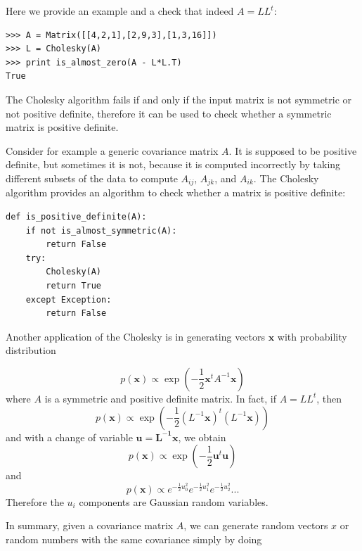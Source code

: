 \documentclass[justified,sixbynine]{tufte-book}
\def\ft{\small\tt}
\theoremstyle{plain}%
\theoremstyle{definition}
\theoremstyle{remark}
\begin{document}
\begin{fullwidth}
Here we provide an example and a check that indeed $A=L L^t$:

\begin{lstlisting}[caption={in file: {\ft nlib.py}}]
>>> A = Matrix([[4,2,1],[2,9,3],[1,3,16]])
>>> L = Cholesky(A)
>>> print is_almost_zero(A - L*L.T)
True
\end{lstlisting}

The Cholesky algorithm fails if and only if the input matrix is not symmetric or not positive definite, therefore it can be used to check whether a symmetric matrix is positive definite.

Consider for example a generic covariance matrix $A$. It is supposed to be positive definite, but sometimes it is not, because it is computed incorrectly by taking different subsets of the data to compute $A_{ij}$, $A_{jk}$, and $A_{ik}$. The Cholesky algorithm provides an algorithm to check whether a matrix is positive definite:

\begin{lstlisting}[caption={in file: {\ft nlib.py}}]
def is_positive_definite(A):
    if not is_almost_symmetric(A):
        return False
    try:
        Cholesky(A)
        return True
    except Exception:
        return False
\end{lstlisting}

Another application of the Cholesky is in generating vectors $\mathbf{x}$ with probability distribution

\begin{equation}
p(\mathbf{x}) \propto \exp\left(-\frac12 \mathbf{x}^t A^{-1} \mathbf{x}\right)
\end{equation}
where $A$ is a symmetric and positive definite matrix. In fact, if $A=LL^t$, then
\begin{equation}
p(\mathbf{x}) \propto \exp\left(-\frac12 (L^{-1}\mathbf{x})^t (L^{-1}\mathbf{x})\right)
\end{equation}
and with a change of variable $\mathbf{u}=\mathbf{L^{-1}x}$, we obtain
\begin{equation}
p(\mathbf{x}) \propto \exp\left(-\frac12 \mathbf{u}^t \mathbf{u}\right)
\end{equation}
and
\begin{equation}
p(\mathbf{x}) \propto e^{-\frac12 u_0^2}e^{-\frac12 u_1^2}e^{-\frac12 u_2^2}...
\end{equation}
Therefore the $u_i$ components are Gaussian random variables.

In summary, given a covariance matrix $A$, we can generate random vectors $x$ or random numbers with the same covariance simply by doing


\end{fullwidth}
\end{document}
